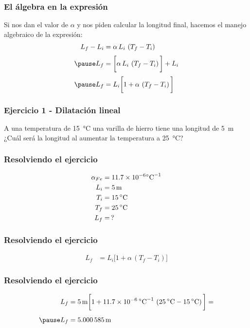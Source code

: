\documentclass[14pt]{beamer}
\begin{document}
\begin{frame}
\frametitle{El álgebra en la expresión}
Si nos dan el valor de $\alpha$ y nos piden calcular la longitud final, hacemos el manejo algebraico de la expresión:
\pause
\begin{eqnarray*}
\begin{aligned}
L_{f} - L_{i} &= \alpha \, L_{i} \, \left( T_{f} - T_{i} \right) \\[0.25em] \pause
L_{f} &= \bigg[ \alpha \, L_{i} \, \left( T_{f} - T_{i} \right) \bigg] + L_{i} \\[0.25em] \pause
L_{f} &= L_{i} \bigg[ 1 + \alpha \, \left( T_{f} - T_{i} \right) \bigg]
\end{aligned}
\end{eqnarray*}
\end{frame}
\begin{frame}
\frametitle{Ejercicio 1 - Dilatación lineal}
A una temperatura de \SI{15}{\degreeCelsius} una varilla de hierro tiene una longitud de \SI{5}{\meter}
\\
\bigskip
\pause 
¿Cuál será la longitud al aumentar la temperatura a \SI{25}{\degreeCelsius}?
\end{frame}
\begin{frame}
\frametitle{Resolviendo el ejercicio}
\vspace*{-1cm}
\begin{align*}
\alpha_{Fe} &= \num{11.7d-6} \unit{\degreeCelsius}^{-1} \\
L_{i} &= \SI{5}{\meter} \\
T_{i} &= \SI{15}{\degreeCelsius} \\
T_{f} &= \SI{25}{\degreeCelsius} \\
L_{f} &= \,?
\end{align*}
\end{frame}
\begin{frame}
\frametitle{Resolviendo el ejercicio}
\begin{align*}
L_{f} &= L_{i} \bigg[ 1 + \alpha \, \left( T_{f} - T_{i} \right) \bigg]
\end{align*}
\end{frame}
\begin{frame}
\frametitle{Resolviendo el ejercicio}
\begin{eqnarray*}
\begin{aligned}
L_{f} &= \SI{5}{\meter} \bigg[ 1 + \num{11.7d-6} \, \unit{\degreeCelsius}^{-1} \, \left( \SI{25}{\degreeCelsius} - \SI{15}{\degreeCelsius} \right) \bigg] = \\[0.5em] \pause
L_{f} &= \SI{5.000585}{\meter}
\end{aligned}
\end{eqnarray*}
\end{frame}
\end{document}

